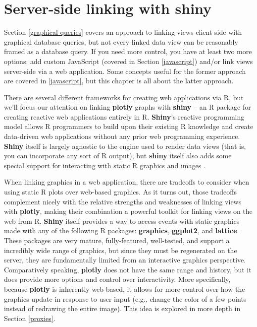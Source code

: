 \documentclass[
  12pt,
]{krantz}
\begin{document}
\hypertarget{linking-views-with-shiny}{%
\chapter{Server-side linking with shiny}\label{linking-views-with-shiny}}

Section \ref{graphical-queries} covers an approach to linking views client-side with graphical database queries, but not every linked data view can be reasonably framed as a database query. If you need more control, you have at least two more options: add custom JavaScript (covered in Section \ref{javascript}) and/or link views server-side via a web application. Some concepts useful for the former approach are covered in \ref{javascript}, but this chapter is all about the latter approach.

There are several different frameworks for creating web applications via R, but we'll focus our attention on linking \textbf{plotly} graphs with \textbf{shiny} -- an R package for creating reactive web applications entirely in R. \textbf{Shiny}'s reactive programming model allows R programmers to build upon their existing R knowledge and create data-driven web applications without any prior web programming experience. \textbf{Shiny} itself is largely agnostic to the engine used to render data views (that is, you can incorporate any sort of R output), but \textbf{shiny} itself also adds some special support for interacting with static R graphics and images \citep{shiny-plot-interaction}.

When linking graphics in a web application, there are tradeoffs to consider when using static R plots over web-based graphics. As it turns out, those tradeoffs complement nicely with the relative strengths and weaknesses of linking views with \textbf{plotly}, making their combination a powerful toolkit for linking views on the web from R. \textbf{Shiny} itself provides a way to access events with static graphics made with any of the following R packages: \textbf{graphics}, \textbf{ggplot2}, and \textbf{lattice}. These packages are very mature, fully-featured, well-tested, and support a incredibly wide range of graphics, but since they must be regenerated on the server, they are fundamentally limited from an interactive graphics perspective. Comparatively speaking, \textbf{plotly} does not have the same range and history, but it does provide more options and control over interactivity. More specifically, because \textbf{plotly} is inherently web-based, it allows for more control over how the graphics update in response to user input (e.g., change the color of a few points instead of redrawing the entire image). This idea is explored in more depth in Section \ref{proxies}.
\end{document}
